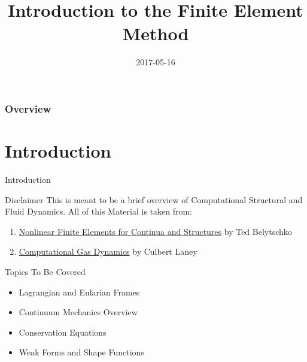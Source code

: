 \documentclass{beamer}
\title{Introduction to the Finite Element Method}
\institute{Corvid Technologies}
\date{2017-05-16}
\begin{document}
\frame{\titlepage}
\begin{frame}
	\frametitle{Overview} 
	\tableofcontents
\end{frame}
\section{Introduction}
\begin{frame}{Introduction}
\begin{block}{Disclaimer}
	This is meant to be a brief overview of Computational Structural and Fluid Dynamics.
	All of this Material is taken from:
	\begin{enumerate}
		\item \underline{Nonlinear Finite Elements for Continua and Structures} by Ted Belytschko 
		\item \underline{Computational Gas Dynamics} by Culbert Laney
	\end{enumerate}
\end{block}
\begin{block}{Topics To Be Covered}
\begin{itemize}
	\item Lagrangian and Eularian Frames
	\item Continuum Mechanics Overview
	\item Conservation Equations
	\item Weak Forms and Shape Functions
\end{itemize}
\end{block}
\end{frame}
\end{document}
